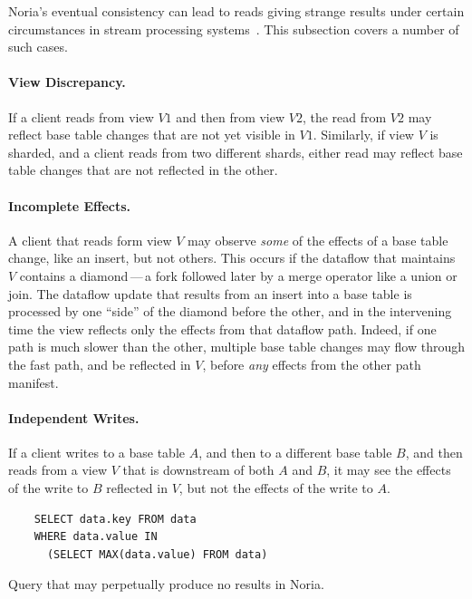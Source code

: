 Noria's eventual consistency can lead to reads giving strange results under
certain circumstances in stream processing systems~\cite{materialize-eventual}.
This subsection covers a number of such cases.

\paragraph{View Discrepancy.}
If a client reads from view $V1$ and then from view $V2$, the read from $V2$ may
reflect base table changes that are not yet visible in $V1$. Similarly, if view
$V$ is sharded, and a client reads from two different shards, either read may
reflect base table changes that are not reflected in the other.

\paragraph{Incomplete Effects.}
A client that reads form view $V$ may observe \emph{some} of the effects of a
base table change, like an insert, but not others. This occurs if the dataflow
that maintains $V$ contains a diamond\,---\,a fork followed later by a merge
operator like a union or join. The dataflow update that results from an insert
into a base table is processed by one ``side'' of the diamond before the other,
and in the intervening time the view reflects only the effects from that
dataflow path. Indeed, if one path is much slower than the other, multiple base
table changes may flow through the fast path, and be reflected in $V$, before
\emph{any} effects from the other path manifest.

\paragraph{Independent Writes.}
If a client writes to a base table $A$, and then to a different base table $B$,
and then reads from a view $V$ that is downstream of both $A$ and $B$, it may
see the effects of the write to $B$ reflected in $V$, but not the effects of the
write to $A$.

\begin{listing}[h]
  \begin{verbatim}
    SELECT data.key FROM data
    WHERE data.value IN
      (SELECT MAX(data.value) FROM data)
  \end{verbatim}
  \caption{Query that may perpetually produce no results in Noria.}
  \label{l:always-wrong}
\end{listing}


